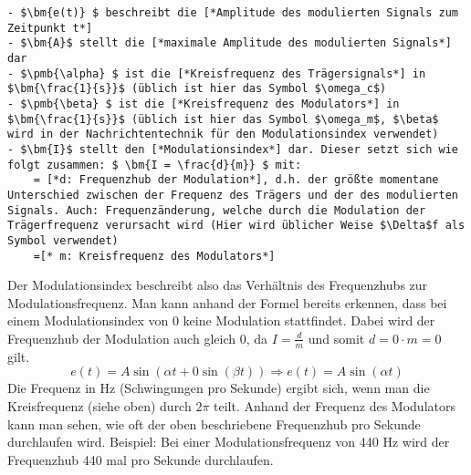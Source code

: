 \begin{lstlisting}[mathescape]
- $\bm{e(t)} $ beschreibt die [*Amplitude des modulierten Signals zum Zeitpunkt t*]
- $\bm{A}$ stellt die [*maximale Amplitude des modulierten Signals*] dar
- $\pmb{\alpha} $ ist die [*Kreisfrequenz des Trägersignals*] in $\bm{\frac{1}{s}}$ (üblich ist hier das Symbol $\omega_c$)
- $\pmb{\beta} $ ist die [*Kreisfrequenz des Modulators*] in $\bm{\frac{1}{s}}$ (üblich ist hier das Symbol $\omega_m$, $\beta$ wird in der Nachrichtentechnik für den Modulationsindex verwendet)
- $\bm{I}$ stellt den [*Modulationsindex*] dar. Dieser setzt sich wie folgt zusammen: $ \bm{I = \frac{d}{m}} $ mit:
	= [*d: Frequenzhub der Modulation*], d.h. der größte momentane Unterschied zwischen der Frequenz des Trägers und der des modulierten Signals. Auch: Frequenzänderung, welche durch die Modulation der Trägerfrequenz verursacht wird (Hier wird üblicher Weise $\Delta$f als Symbol verwendet)
	=[* m: Kreisfrequenz des Modulators*]
\end{lstlisting} \cite{chowningPaper}

Der Modulationsindex beschreibt also das Verhältnis des Frequenzhubs zur Modulationsfrequenz.
Man kann anhand der Formel bereits erkennen, dass bei einem Modulationsindex von 0 keine Modulation stattfindet. Dabei wird der Frequenzhub der Modulation auch gleich 0, da $ I=\frac{d}{m} $ und somit $ d = 0\cdot m = 0 $ gilt. 
\begin{equation} e(t) = A \sin(\alpha t + 0 \sin(\beta t))  \Rightarrow  e(t) = A \sin(\alpha t) \end{equation}
Die Frequenz in Hz (Schwingungen pro Sekunde) ergibt sich, wenn man die Kreisfrequenz (siehe oben) durch $2\pi$ teilt.
Anhand der Frequenz des Modulators kann man sehen, wie oft der oben beschriebene Frequenzhub pro Sekunde durchlaufen wird. Beispiel: Bei einer Modulationsfrequenz von 440 Hz wird der Frequenzhub 440 mal pro Sekunde durchlaufen.
